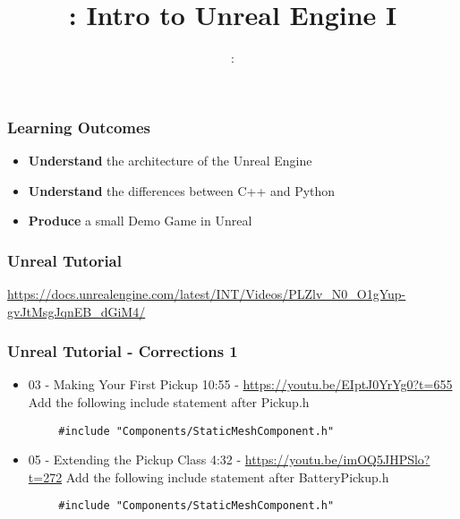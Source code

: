 \usepackage{../../beamerthemeFalmouthGamesAcademy}
\usepackage{multimedia}
\graphicspath{ {../../} }

\usepackage{textcomp}

\usepackage[normalem]{ulem}
\usepackage{wasysym}

\usepackage{pdfpages}

\usetikzlibrary{arrows,automata}







\title{\sessionnumber: Intro to Unreal Engine I}
\subtitle{\modulecode: \moduletitle}

\frame{\titlepage} 

\begin{frame}
	\frametitle{Learning Outcomes}
	\begin{itemize}
		\item \textbf{Understand} the architecture of the Unreal Engine
		\item \textbf{Understand} the differences between C++ and Python
		\item \textbf{Produce} a small Demo Game in Unreal
	\end{itemize}
\end{frame}

\begin{frame}
	\frametitle{Unreal Tutorial}
	\begin{center}
		\url{https://docs.unrealengine.com/latest/INT/Videos/PLZlv_N0_O1gYup-gvJtMsgJqnEB_dGiM4/}
	\end{center}
\end{frame}

\begin{frame}[fragile]
\frametitle{Unreal Tutorial - Corrections 1}
	\begin{itemize}
		\item 03 - Making Your First Pickup 10:55 - \url{https://youtu.be/EIptJ0YrYg0?t=655} Add the following include statement after Pickup.h
	\end{itemize}
	\begin{lstlisting}
		#include "Components/StaticMeshComponent.h"
	\end{lstlisting}
	\begin{itemize}
		\item 05 - Extending the Pickup Class 4:32 - \url{https://youtu.be/imOQ5JHPSlo?t=272} Add the following include statement after BatteryPickup.h
	\end{itemize}
	\begin{lstlisting}
		#include "Components/StaticMeshComponent.h"
	\end{lstlisting}
\end{frame}

